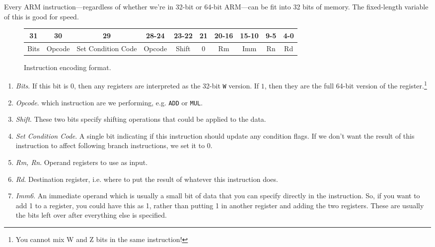   \begin{definition}
    Every ARM instruction---regardless of whether we're in 32-bit or 64-bit ARM---can be fit into 32 bits of memory. The fixed-length variable of this is good for speed.   
    
    \begin{figure}[H]
      \centering 
      \begin{tabular}{|c|c|c|c|c|c|c|c|c|c|}
      \hline
      \textbf{31} & \textbf{30} & \textbf{29} & \textbf{28-24} & \textbf{23-22} & \textbf{21} & \textbf{20-16} & \textbf{15-10} & \textbf{9-5} & \textbf{4-0} \\
      \hline
      Bits & Opcode & Set Condition Code & Opcode & Shift & 0 & Rm & Imm & Rn & Rd \\
      \hline
      \end{tabular}
      \caption{Instruction encoding format.} 
    \end{figure}

    \begin{enumerate}
      \item \textit{Bits}. If this bit is $0$, then any registers are interpreted as the 32-bit \texttt{W} version. If $1$, then they are the full 64-bit version of the register.\footnote{You cannot mix W and Z bits in the same instruction!}

      \item \textit{Opcode}. which instruction are we performing, e.g. \texttt{ADD} or \texttt{MUL}. 

      \item \textit{Shift}. These two bits specify shifting operations that could be applied to the data. 

      \item \textit{Set Condition Code}. A single bit indicating if this instruction should update any condition flags. If we don't want the result of this instruction to affect following branch instructions, we set it to $0$. 

      \item \textit{Rm, Rn}. Operand registers to use as input. 
        
      \item \textit{Rd}. Destination register, i.e. where to put the result of whatever this instruction does. 

      \item \textit{Imm6}. An immediate operand which is usually a small bit of data that you can specify directly in the instruction. So, if you want to add 1 to a register, you could have this as 1, rather than putting 1 in another register and adding the two registers. These are usually the bits left over after everything else is specified.
    \end{enumerate}
  \end{definition}

